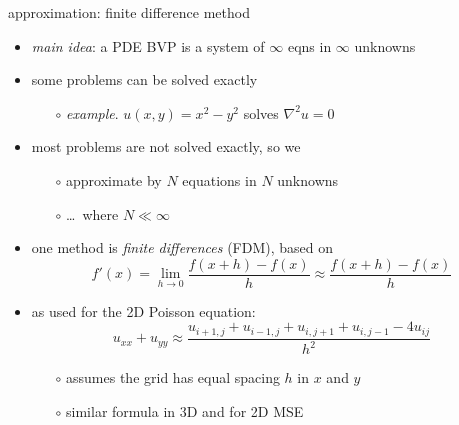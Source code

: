 \documentclass[hide notes,intlimits,usenames,dvipsnames]{beamer}
\newcommand{\grad}{\nabla}
\begin{document}
\begin{frame}{approximation: finite difference method}
\begin{itemize}
\item \emph{main idea}: a PDE BVP is a system of $\infty$ eqns in $\infty$ unknowns
\item some problems can be solved exactly
	\begin{itemize}
	\item[$\circ$] \emph{example}.  $u(x,y)=x^2-y^2$ solves $\grad^2 u = 0$
	\end{itemize}
\item most problems are not solved exactly, so we
	\begin{itemize}
	\item[$\circ$] \alert{approximate by $N$ equations in $N$ unknowns}
	\item[$\circ$] \dots \, where $N \ll \infty$
	\end{itemize}
\item one method is \emph{finite differences} (FDM), based on
	    $$f'(x) = \lim_{h \to 0} \frac{f(x+h)-f(x)}{h} \approx \frac{f(x+h)-f(x)}{h}$$
\item as used for the 2D Poisson equation:
	    $$u_{xx}+u_{yy} \approx \frac{u_{i+1,j} + u_{i-1,j} + u_{i,j+1} + u_{i,j-1} - 4 u_{ij}}{h^2}$$
	\vspace{-4mm}
	\begin{itemize}
	\item[$\circ$] assumes the grid has equal spacing $h$ in $x$ and $y$
	\item[$\circ$] similar formula in 3D and for 2D MSE
	\end{itemize}
\end{itemize}
\end{frame}
\end{document}
